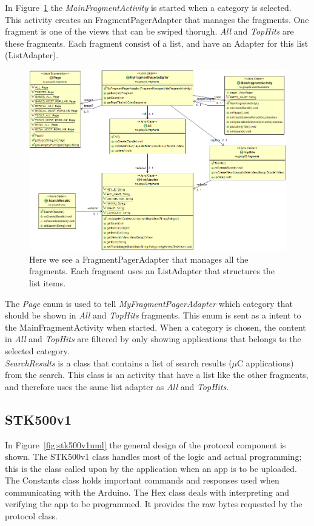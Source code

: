 	In Figure~\ref{fig:maingui} the \textit{MainFragmentActivity} is started when a category is selected. This activity creates an FragmentPagerAdapter that manages the fragments. One fragment is one of the views that can be swiped thorugh. \textit{All} and \textit{TopHits} are these fragments. Each fragment consist of a list, and have an Adapter for this list (ListAdapter).

	\begin{figure}[H]
	\hspace*{-1.0in}
	\includegraphics[scale=0.55]{images/UML/main.png}
	\caption[UML - Main GUI]{Here we see a FragmentPagerAdapter that manages all the fragments. Each fragment uses an ListAdapter that structures the list items.}
	\label{fig:maingui}
	\end{figure}

	The \textit{Page} enum is used to tell \textit{MyFragmentPagerAdapter} which category that should be shown in \textit{All} and \textit{TopHits} fragments. This enum is sent as a intent to the MainFragmentActivity when started. When a category is chosen, the content in \textit{All} and \textit{TopHits} are filtered by only showing applications that belongs to the selected category.\\

	\textit{SearchResults} is a class that contains a list of search results ($\mu$C applications) from the search. This class is an activity that have a list like the other fragments, and therefore uses the same list adapter as \textit{All} and \textit{TopHits}. 

	\subsection{STK500v1}
	In Figure~\ref{fig:stk500v1uml} the general design of the protocol component is shown. The STK500v1 class
    handles most of the logic and actual programming; this is the class called upon by the application when
    an app is to be uploaded. The Constants class holds important commands and responses used when communicating
    with the Arduino.
    The Hex class deals with interpreting and verifying the app to be programmed. It provides the raw bytes
    requested by the protocol class.\\
    
